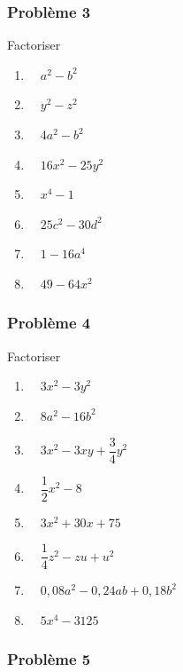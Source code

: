 \documentclass[
  12pt,
]{book}
\providecommand{\tightlist}{%
  \setlength{\itemsep}{0pt}\setlength{\parskip}{0pt}}
\begin{document}
\hypertarget{probluxe8me-3-1}{%
\subsubsection*{Problème 3}\label{probluxe8me-3-1}}

Factoriser

\begin{enumerate}
\def\labelenumi{\arabic{enumi}.}
\tightlist
\item
  \(\quad a^2-b^2\)
\item
  \(\quad y^2-z^2\)
\item
  \(\quad 4a^2-b^2\)
\item
  \(\quad 16x^2-25y^2\)
\item
  \(\quad x^4-1\)
\item
  \(\quad 25c^2-30d^2\)
\item
  \(\quad 1-16a^4\)
\item
  \(\quad 49-64x^2\)
\end{enumerate}

\hypertarget{probluxe8me-4-1}{%
\subsubsection*{Problème 4}\label{probluxe8me-4-1}}

Factoriser

\begin{enumerate}
\def\labelenumi{\arabic{enumi}.}
\tightlist
\item
  \(\quad 3x^2-3y^2\)
\item
  \(\quad 8a^2-16b^2\)
\item
  \(\quad 3x^2-3xy+\dfrac{3}{4}y^2\)
\item
  \(\quad \dfrac{1}{2}x^2-8\)
\item
  \(\quad 3x^2+30x+75\)
\item
  \(\quad \dfrac{1}{4}z^2-zu+u^2\)
\item
  \(\quad 0{,}08a^2-0{,}24ab+0{,}18b^2\)
\item
  \(\quad 5x^4-3125\)
\end{enumerate}

\hypertarget{probluxe8me-5}{%
\subsubsection*{Problème 5}\label{probluxe8me-5}}
\end{document}
